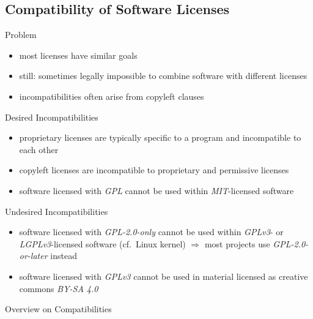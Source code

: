\subsection{Compatibility of Software Licenses}
\begin{frame}{\insertsubsection}%
	\begin{fancycolumns}
		\begin{note}{Problem}
			\begin{itemize}
				\item most licenses have similar goals
				\item still: sometimes legally impossible to combine software with different licenses
				\item incompatibilities often arise from copyleft clauses
			\end{itemize}
		\end{note}
		\begin{example}{Desired Incompatibilities}
			\begin{itemize}
				\item proprietary licenses are typically specific to a program and incompatible to each other
				\item copyleft licenses are incompatible to proprietary and permissive licenses
				\item software licensed with \emph{GPL} cannot be used within \emph{MIT}-licensed software
			\end{itemize}
		\end{example}
		\nextcolumn
		\begin{example}{Undesired Incompatibilities}
			\begin{itemize}
				\item software licensed with \emph{GPL-2.0-only} cannot be used within \emph{GPLv3}- or \emph{LGPLv3}-licensed software (cf.\ Linux kernel) $\Rightarrow$ most projects use \emph{GPL-2.0-or-later} instead
				\item software licensed with \emph{GPLv3} cannot be used in material licensed as creative commons \emph{BY-SA 4.0} 
			\end{itemize}
		\end{example}
		\begin{exampletight}{Overview on Compatibilities}
			\centering{} %
		\end{exampletight}
	\end{fancycolumns}
\end{frame}

